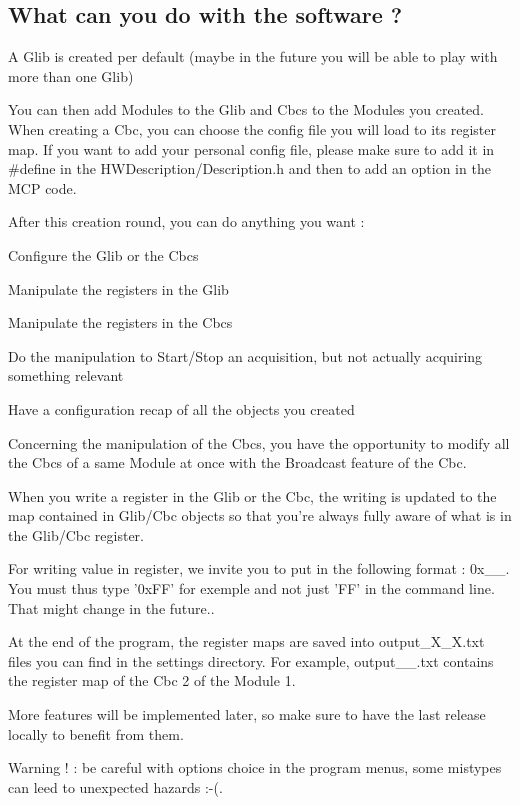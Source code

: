 \subsection*{What can you do with the software ? }

A Glib is created per default (maybe in the future you will be able to play with more than one Glib)

You can then add Modules to the Glib and Cbcs to the Modules you created. When creating a Cbc, you can choose the config file you will load to its register map. If you want to add your personal config file, please make sure to add it in \#define in the H\-W\-Description/\-Description.\-h and then to add an option in the M\-C\-P code.

After this creation round, you can do anything you want \-:
\begin{DoxyItemize}
\item Configure the Glib or the Cbcs
\item Manipulate the registers in the Glib
\item Manipulate the registers in the Cbcs
\item Do the manipulation to Start/\-Stop an acquisition, but not actually acquiring something relevant
\item Have a configuration recap of all the objects you created
\end{DoxyItemize}

Concerning the manipulation of the Cbcs, you have the opportunity to modify all the Cbcs of a same Module at once with the Broadcast feature of the Cbc.

When you write a register in the Glib or the Cbc, the writing is updated to the map contained in Glib/\-Cbc objects so that you're always fully aware of what is in the Glib/\-Cbc register.

For writing value in register, we invite you to put in the following format \-: 0x\-\_\-\-\_\-. You must thus type '0x\-F\-F' for exemple and not just 'F\-F' in the command line. That might change in the future..

At the end of the program, the register maps are saved into output\-\_\-\-X\-\_\-\-X.\-txt files you can find in the settings directory. For example, output\-\_\-\_.\-txt contains the register map of the Cbc 2 of the Module 1.

More features will be implemented later, so make sure to have the last release locally to benefit from them.

Warning ! \-: be careful with options choice in the program menus, some mistypes can leed to unexpected hazards \-:-\/(.

